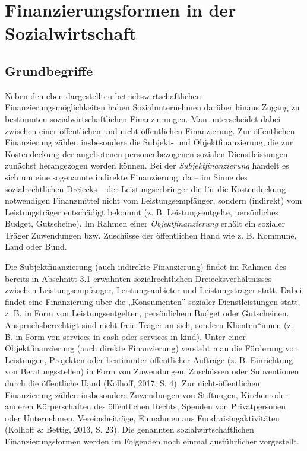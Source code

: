\documentclass[
  letterpaper,
]{book}
\begin{document}
\section{Finanzierungsformen in der
Sozialwirtschaft}\label{finanzierungsformen}

\subsection{Grundbegriffe}\label{grundbegriffe-finanzierungsformen-sozialwirtschaft}

Neben den eben dargestellten betriebswirtschaftlichen
Finanzierungsmöglichkeiten haben Sozialunternehmen darüber hinaus Zugang
zu bestimmten sozialwirtschaftlichen Finanzierungen. Man unterscheidet
dabei zwischen einer öffentlichen und nicht-öffentlichen Finanzierung.
Zur öffentlichen Finanzierung zählen insbesondere die Subjekt- und
Objektfinanzierung, die zur Kostendeckung der angebotenen
personenbezogenen sozialen Dienstleistungen zunächst herangezogen werden
können. Bei der \emph{Subjektfinanzierung} handelt es sich um eine
sogenannte indirekte Finanzierung, da -- im Sinne des sozialrechtlichen
Dreiecks -- der Leistungserbringer die für die Kostendeckung notwendigen
Finanzmittel nicht vom Leistungsempfänger, sondern (indirekt) vom
Leistungsträger entschädigt bekommt (z. B. Leistungsentgelte,
persönliches Budget, Gutscheine). Im Rahmen einer
\emph{Objektfinanzierung} erhält ein sozialer Träger Zuwendungen bzw.
Zuschüsse der öffentlichen Hand wie z. B. Kommune, Land oder Bund.

Die Subjektfinanzierung (auch indirekte Finanzierung) findet im Rahmen
des bereits in Abschnitt 3.1 erwähnten sozialrechtlichen
Dreiecksverhältnisses zwischen Leistungsempfänger, Leistungsanbieter und
Leistungsträger statt. Dabei findet eine Finanzierung über die
„Konsumenten'' sozialer Dienstleistungen statt, z. B. in Form von
Leistungsentgelten, persönlichem Budget oder Gutscheinen.
Anspruchsberechtigt sind nicht freie Träger an sich, sondern
Klienten*innen (z. B. in Form von services in cash oder services in
kind). Unter einer Objektfinanzierung (auch direkte Finanzierung)
versteht man die Förderung von Leistungen, Projekten oder bestimmter
öffentlicher Aufträge (z. B. Einrichtung von Beratungsstellen) in Form
von Zuwendungen, Zuschüssen oder Subventionen durch die öffentliche Hand
(Kolhoff, 2017, S. 4). Zur nicht-öffentlichen Finanzierung zählen
insbesondere Zuwendungen von Stiftungen, Kirchen oder anderen
Körperschaften des öffentlichen Rechts, Spenden von Privatpersonen oder
Unternehmen, Vereinsbeiträge, Einnahmen aus Fundraisingaktivitäten
(Kolhoff \& Bettig, 2013, S. 23). Die genannten sozialwirtschaftlichen
Finanzierungsformen werden im Folgenden noch einmal ausführlicher
vorgestellt.
\end{document}
